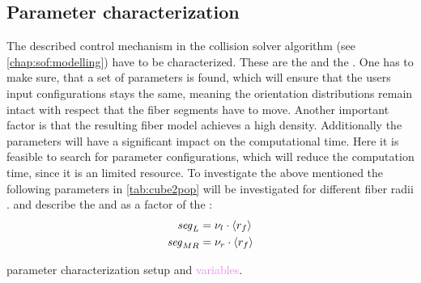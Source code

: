 \subsection{Parameter characterization}\label{sec:modelSetup}
% 
The described control mechanism in the collision solver algorithm  (see \cref{chap:sof:modelling}) have to be characterized.
These are the \segLength{} and the \segRadius{}.
One has to make sure, that a set of parameters is found, which will ensure that the users input configurations stays the same, meaning the orientation distributions remain intact with respect that the fiber segments have to move.
Another important factor is that the resulting fiber model achieves a high density.
Additionally the parameters will have a significant impact on the computational time.
Here it is feasible to search for parameter configurations, which will reduce the computation time, since it is an limited resource.
% 
To investigate the above mentioned \dummy{} the following parameters in \cref{tab:cube2pop} will be investigated for different fiber radii \fiberRadiusMean{}.
\segLengthFactor{} and \segRadiusFactor{} describe the \segLength{} and \segRadius{} as a factor of the \fiberRadiusMean:
\begin{align}
    \begin{split}
        \textnormal{$\mathit{seg}_{L}$} &= \textnormal{$\nu_{l}$} \cdot \textnormal{$\langle{r_f}\rangle$}\\
        \textnormal{$\mathit{seg}_{MR}$} &= \textnormal{$\nu_{r}$} \cdot \textnormal{$\langle{r_f}\rangle$}
    \end{split}
\end{align}
% 
\begin{table}[!b]
%
\centering
{}
\caption{parameter characterization setup and \textcolor{violet}{variables}.}
\label{tab:cube2pop}
\end{table}
